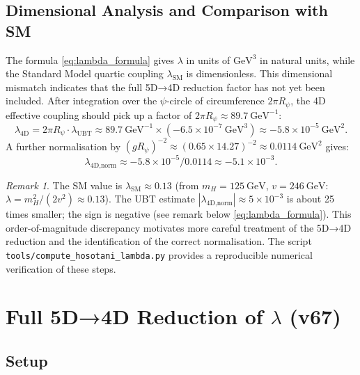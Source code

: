 \documentclass[12pt]{article}
\theoremstyle{definition}
\theoremstyle{remark}
\newtheorem{remark}[theorem]{Remark}
\begin{document}
\subsection{Dimensional Analysis and Comparison with SM}

The formula \eqref{eq:lambda_formula} gives $\lambda$ in units of
$\text{GeV}^3$ in natural units, while the Standard Model quartic
coupling $\lambda_{\text{SM}}$ is dimensionless.  This dimensional
mismatch indicates that the full 5D→4D reduction factor has not yet
been included.  After integration over the $\psi$-circle of
circumference $2\pi R_\psi$, the 4D effective coupling should pick
up a factor of $2\pi R_\psi \approx 89.7~\text{GeV}^{-1}$:
\begin{equation}
  \lambda_{\text{4D}} = 2\pi R_\psi \cdot \lambda_{\text{UBT}}
  \approx 89.7~\text{GeV}^{-1} \times (-6.5 \times 10^{-7}~\text{GeV}^3)
  \approx -5.8 \times 10^{-5}~\text{GeV}^2.
\end{equation}
A further normalisation by $(g R_\psi)^{-2} \approx (0.65 \times
14.27)^{-2} \approx 0.0114~\text{GeV}^2$ gives:
\begin{equation}
  \lambda_{\text{4D,norm}} \approx -5.8 \times 10^{-5} / 0.0114
  \approx -5.1 \times 10^{-3}.
\end{equation}

\begin{remark}
The SM value is $\lambda_{\text{SM}} \approx 0.13$ (from $m_H = 125~\text{GeV}$,
$v = 246~\text{GeV}$: $\lambda = m_H^2/(2v^2) \approx 0.13$).
The UBT estimate $|\lambda_{\text{4D,norm}}| \approx 5 \times 10^{-3}$
is about 25 times smaller; the sign is negative (see remark below
\eqref{eq:lambda_formula}).  This order-of-magnitude discrepancy
motivates more careful treatment of the 5D→4D reduction and the
identification of the correct normalisation.  The script
\texttt{tools/compute\_hosotani\_lambda.py} provides a reproducible
numerical verification of these steps.
\end{remark}

\section{Full 5D→4D Reduction of $\lambda$ (v67)}
\label{sec:lambda_5d_to_4d}

\subsection{Setup}
\end{document}
